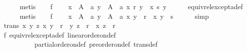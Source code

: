 \begin{isabellebody}
\ \ \ \ \isamarkupfalse%
\ metis\isanewline
\ \ \isamarkupfalse%
\ f{}{\isacharunderscore}{\kern0pt}{}{\isacharcolon}{\kern0pt}\isanewline
\ \ \ \ {\isachardoublequoteopen}{\isasymforall}x\ {\isasymin}\ A\ {\isacharminus}{\kern0pt}\ {\isacharbraceleft}{\kern0pt}a{\isacharbraceright}{\kern0pt}{\isachardot}{\kern0pt}\ {\isasymforall}y\ {\isasymin}\ A\ {\isacharminus}{\kern0pt}\ {\isacharbraceleft}{\kern0pt}a{\isacharbraceright}{\kern0pt}{\isachardot}{\kern0pt}\ x\ {\isasympreceq}\isactrlsub r\ y\ {\isasymlongleftrightarrow}\ x\ {\isasympreceq}\isactrlsub s\ y{\isachardoublequoteclose}\isanewline
\ \ \ \ \isamarkupfalse%
\ equiv{\isacharunderscore}{\kern0pt}rel{\isacharunderscore}{\kern0pt}except{\isacharunderscore}{\kern0pt}a{\isacharunderscore}{\kern0pt}def\isanewline
\ \ \ \ \isamarkupfalse%
\ metis\isanewline
\ \ \isamarkupfalse%
\ f{}{\isacharunderscore}{\kern0pt}{}{\isacharcolon}{\kern0pt}\isanewline
\ \ \ \ {\isachardoublequoteopen}{\isasymforall}x\ {\isasymin}\ A\ {\isacharminus}{\kern0pt}\ {\isacharbraceleft}{\kern0pt}a{\isacharbraceright}{\kern0pt}{\isachardot}{\kern0pt}\ {\isasymforall}y\ {\isasymin}\ A\ {\isacharminus}{\kern0pt}\ {\isacharbraceleft}{\kern0pt}a{\isacharbraceright}{\kern0pt}{\isachardot}{\kern0pt}\ {\isacharparenleft}{\kern0pt}x{\isacharcomma}{\kern0pt}\ y{\isacharparenright}{\kern0pt}\ {\isasymin}\ r\ {\isasymlongleftrightarrow}\ {\isacharparenleft}{\kern0pt}x{\isacharcomma}{\kern0pt}\ y{\isacharparenright}{\kern0pt}\ {\isasymin}\ s{\isachardoublequoteclose}\isanewline
\ \ \ \ \isamarkupfalse%
\ simp\isanewline
\ \ \isamarkupfalse%
\ trans{\isacharcolon}{\kern0pt}\ {\isachardoublequoteopen}{\isasymforall}x\ y\ z{\isachardot}{\kern0pt}\ {\isacharparenleft}{\kern0pt}x{\isacharcomma}{\kern0pt}\ y{\isacharparenright}{\kern0pt}\ {\isasymin}\ r\ {\isasymlongrightarrow}\ {\isacharparenleft}{\kern0pt}y{\isacharcomma}{\kern0pt}\ z{\isacharparenright}{\kern0pt}\ {\isasymin}\ r\ {\isasymlongrightarrow}\ {\isacharparenleft}{\kern0pt}x{\isacharcomma}{\kern0pt}\ z{\isacharparenright}{\kern0pt}\ {\isasymin}\ r{\isachardoublequoteclose}\isanewline
\ \ \ \ \isamarkupfalse%
\ f{}\ equiv{\isacharunderscore}{\kern0pt}rel{\isacharunderscore}{\kern0pt}except{\isacharunderscore}{\kern0pt}a{\isacharunderscore}{\kern0pt}def\ linear{\isacharunderscore}{\kern0pt}order{\isacharunderscore}{\kern0pt}on{\isacharunderscore}{\kern0pt}def\isanewline
\ \ \ \ \ \ \ \ \ \ partial{\isacharunderscore}{\kern0pt}order{\isacharunderscore}{\kern0pt}on{\isacharunderscore}{\kern0pt}def\ preorder{\isacharunderscore}{\kern0pt}on{\isacharunderscore}{\kern0pt}def\ trans{\isacharunderscore}{\kern0pt}def\isanewline

\end{isabellebody}
